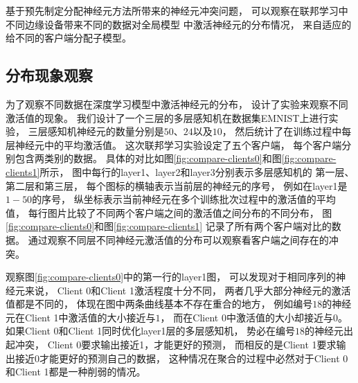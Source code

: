 基于预先制定分配神经元方法所带来的神经元冲突问题，
可以观察在联邦学习中不同边缘设备带来不同的数据对全局模型
中激活神经元的分布情况，
来自适应的给不同的客户端分配子模型。

\subsection{分布现象观察}
为了观察不同数据在深度学习模型中激活神经元的分布，
设计了实验来观察不同激活值的现象。
我们设计了一个三层的多层感知机在数据集EMNIST上进行实验，
三层感知机神经元的数量分别是$50$、$24$以及$10$，
然后统计了在训练过程中每层神经元中的平均激活值。
这次联邦学习实验设定了五个客户端，
每个客户端分别包含两类别的数据。
具体的对比如图\ref{fig:compare-clients0}和图\ref{fig:compare-clients1}所示，
图中每行的layer1、layer2和layer3分别表示多层感知机的
第一层、第二层和第三层，
每个图标的横轴表示当前层的神经元的序号，
例如在layer1是$1-50$的序号，
纵坐标表示当前神经元在多个训练批次过程中的激活值的平均值，
每行图片比较了不同两个客户端之间的激活值之间分布的不同分布，
图\ref{fig:compare-clients0}和图\ref{fig:compare-clients1}
记录了所有两个客户端对比的数据。
通过观察不同层不同神经元激活值的分布可以观察看客户端之间存在的冲突。

观察图\ref{fig:compare-clients0}中的第一行的layer1图，
可以发现对于相同序列的神经元来说，
Client 0和Client 1激活程度十分不同，
两者几乎大部分神经元的激活值都是不同的，
体现在图中两条曲线基本不存在重合的地方，
例如编号$18$的神经元在Client 1中激活值的大小接近与$1$，
而在Client 0中激活值的大小却接近与$0$。
如果Client 0和Client 1同时优化layer1层的多层感知机，
势必在编号$18$的神经元出起冲突，
Client 0要求输出接近1，才能更好的预测，
而相反的是Client 1要求输出接近0才能更好的预测自己的数据，
这种情况在聚合的过程中必然对于Client 0和Client 1都是一种削弱的情况。

